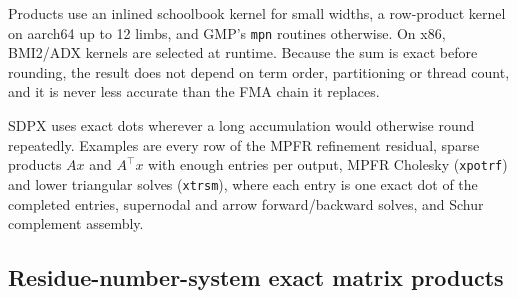 \documentclass[11pt]{article}
\newcommand{\code}[1]{\texttt{#1}}
\begin{document}
Products use an inlined schoolbook kernel for small widths, a row-product
kernel on aarch64 up to 12 limbs, and GMP's \code{mpn} routines otherwise.
On x86, BMI2/ADX kernels are selected at runtime. Because the sum is exact
before rounding, the result does not depend on term order, partitioning or
thread count, and it is never less accurate than the FMA chain it replaces.

SDPX uses exact dots wherever a long accumulation would otherwise round
repeatedly. Examples are every row of the MPFR refinement residual, sparse
products $Ax$ and $A^\top x$ with enough entries per output, MPFR Cholesky
(\code{xpotrf}) and lower triangular solves (\code{xtrsm}), where each entry
is one exact dot of the completed entries, supernodal and arrow
forward/backward solves, and Schur complement assembly.

\subsection{Residue-number-system exact matrix products}
\label{sec:rns}
\end{document}

